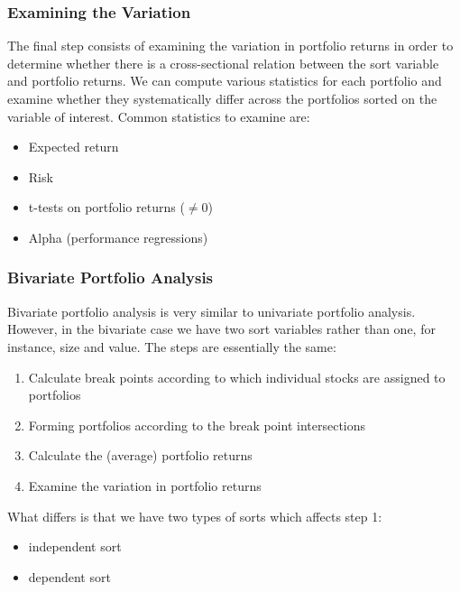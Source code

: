 \documentclass[xcolor=dvipsnames, english, 8pt]{beamer}
\begin{document}
\begin{frame}
    \frametitle{Examining the Variation}
    The final step consists of examining the variation in portfolio returns in order to determine whether there is a cross-sectional relation between the sort variable and portfolio returns. We can compute various statistics for each portfolio and examine whether they systematically differ across the portfolios sorted on the variable of interest. Common statistics to examine are:
   \begin{itemize}
   	\item Expected return
   	\item Risk
   	\item t-tests on portfolio returns ($\neq 0$)
   	\item Alpha (performance regressions)
   \end{itemize}
\end{frame}


\begin{frame}
    \frametitle{Bivariate Portfolio Analysis}
Bivariate portfolio analysis is very similar to univariate portfolio analysis. However, in the bivariate case we have  {\color{ubRed} two sort variables} rather than one, for instance, size and value. The steps are essentially the same:\vspace{0.25cm}\\
\begin{enumerate}[1.]
    \item Calculate {\color{ubRed} break points} according to which individual stocks are assigned to portfolios
    \item Forming portfolios according to the {\color{ubRed}break point intersections}
    \item Calculate the (average) portfolio returns
    \item Examine the variation in portfolio returns\vspace{0.5cm}\\
\end{enumerate}
What differs is that we have two types of sorts which affects {\color{ubRed} step 1}:\vspace{0.25cm}\\
\begin{itemize}
    \item independent sort
    \item dependent sort
\end{itemize}
\end{frame}
\end{document}
